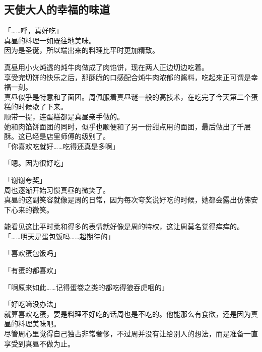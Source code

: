 \subsection{天使大人的幸福的味道}

「……呼，真好吃」\\

真昼的料理一如既往地美味。\\

因为是圣诞，所以端出来的料理比平时更加精致。

真昼用小火炖透的炖牛肉做成了肉馅饼，现在两人正边切边吃着。\\

享受完切饼的快乐之后，那酥脆的口感配合炖牛肉浓郁的酱料，吃起来正可谓是幸福一刻。\\

真昼似乎是特意和了面团。周佩服着真昼谜一般的高技术，在吃完了今天第二个蛋糕的时候歇了下来。\\

顺带一提，连蛋糕都是真昼亲手做的。\\

她和肉馅饼面团的同时，似乎也顺便和了另一份甜点用的面团，最后做出了千层酥。这已经是店里师傅的级别了。\\

「你喜欢吃就好……吃得还真是多啊」

「嗯。因为很好吃」

「谢谢夸奖」\\

周也逐渐开始习惯真昼的微笑了。\\

真昼的这副笑容就像是周的日常，因为每次夸奖说好吃的时候，她都会露出仿佛安下心来的微笑。

能看见这比平时柔和得多的表情就好像是周的特权，这让周莫名觉得痒痒的。\\

「……明天是蛋包饭吗……超期待的」

「喜欢蛋包饭吗」

「有蛋的都喜欢」

「啊原来如此……记得蛋卷之类的都吃得狼吞虎咽的」

「好吃嘛没办法」\\

就算喜欢吃蛋，要是料理不好吃的话周也是不吃的。他能那么有食欲，还是因为真昼的料理美味吧。\\

尽管周心里觉得自己独占非常奢侈，不过周并没有让给别人的想法，而是准备一直享受到真昼不做为止。\\

